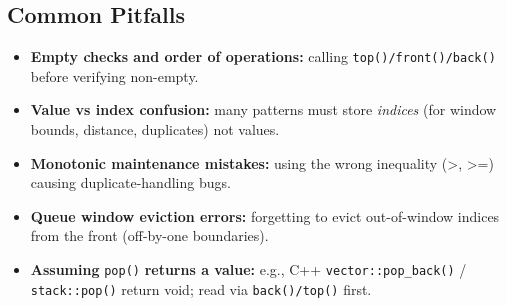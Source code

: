 \subsection{Common Pitfalls}
\begin{itemize}[nosep]
  \item \textbf{Empty checks and order of operations:} calling \texttt{top()/front()/back()} before verifying non-empty.
  \item \textbf{Value vs index confusion:} many patterns must store \emph{indices} (for window bounds, distance, duplicates) not values.
  \item \textbf{Monotonic maintenance mistakes:} using the wrong inequality (>, >=) causing duplicate-handling bugs.
  \item \textbf{Queue window eviction errors:} forgetting to evict out-of-window indices from the front (off-by-one boundaries).
  \item \textbf{Assuming } \texttt{pop()} \textbf{returns a value:} e.g., C++ \texttt{vector::pop\_back()} / \texttt{stack::pop()} return void; read via \texttt{back()/top()} first.
\end{itemize}







